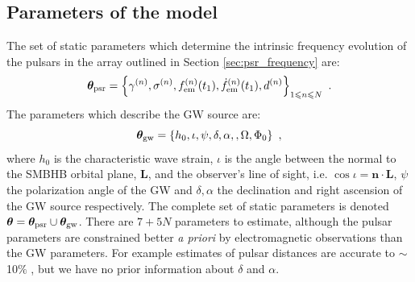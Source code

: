 \documentclass[fleqn,usenatbib,useAMS]{mnras}
\begin{document}
\subsection{Parameters of the model}\label{sec:ss_params}
The set of static parameters which determine the intrinsic frequency evolution of the pulsars in the array outlined in Section \ref{sec:psr_frequency} are:
\begin{equation}
	\boldsymbol{\theta}_{\rm psr} = \left \{ \gamma^{(n)},\sigma^{(n)}, f_{\rm em}^{(n)}(t_1),\dot{f}_{\rm em}^{(n)}(t_1),d^{(n)}\right\}_{1\leq n \leq N} \ .  \label{eq:psrparams}
\end{equation}
The parameters which describe the GW source are:
\begin{equation}
	\boldsymbol{\theta}_{\rm gw} = \left \{h_0, \iota, \psi, \delta, \alpha, , \Omega, \Phi_0 \right \} \ ,  \label{eq:params3}
\end{equation}
where $h_0$ is the characteristic wave strain, $\iota$ is the angle between the normal to the SMBHB orbital plane, $\boldsymbol{L}$, and the observer's line of sight, i.e. $\cos \iota = \boldsymbol{n} \cdot \boldsymbol{L}$, $\psi$ the polarization angle of the GW and $\delta,\alpha$ the declination and right ascension of the GW source respectively. The complete set of static parameters is denoted	$\boldsymbol{\theta} =  \boldsymbol{\theta}_{\rm psr} \cup \boldsymbol{\theta}_{\rm gw}$. There are $7 + 5N$ parameters to estimate, although the pulsar parameters are constrained better \textit{a priori} by electromagnetic observations than the GW parameters. For example estimates of pulsar distances are accurate to $\sim$ 10$\%$ \citep{Cordes2002astro.ph..7156C, Verbiest2012ApJ...755...39V, Desvignes2016,Yao2017}, but we have no prior information about $\delta$ and $\alpha$. \newline 




%
%
%
%
%
%
%
%
%
%
%
\end{document}

